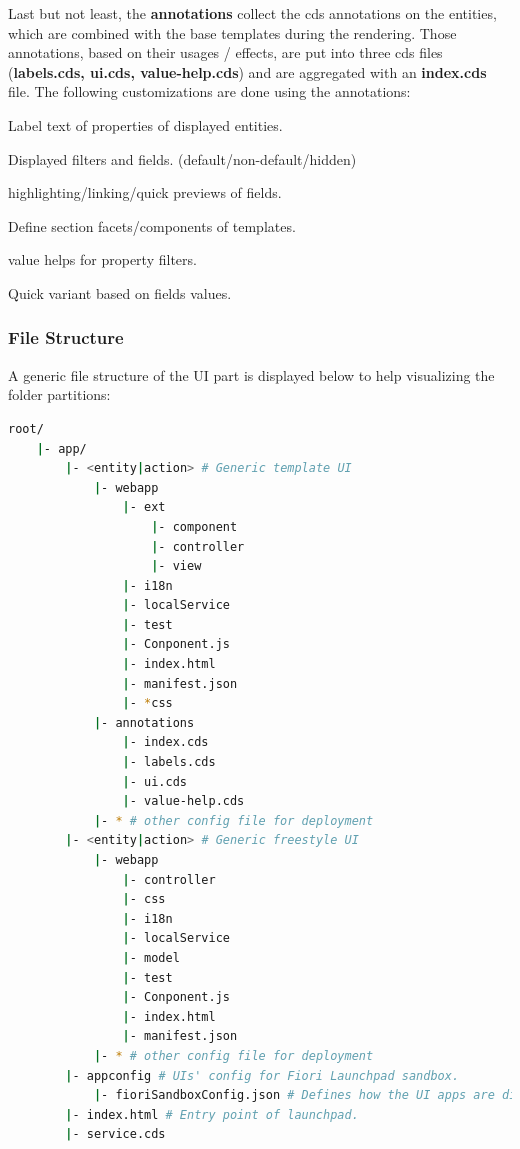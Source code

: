 \bigskip
Last but not least, the \textbf{annotations} collect the cds annotations on the entities, which are combined with the base templates during the rendering.
Those annotations, based on their usages / effects, are put into three cds files (\textbf{labels.cds, ui.cds, value-help.cds}) and are aggregated with an \textbf{index.cds} file.
The following customizations are done using the annotations:

\begin{compactenum}
    \item Label text of properties of displayed entities.
    \item Displayed filters and fields. (default/non-default/hidden)
    \item highlighting/linking/quick previews of fields.
    \item Define section facets/components of templates.
    \item value helps for property filters.
    \item Quick variant based on fields values.
\end{compactenum}

\subsubsection{File Structure}

A generic file structure of the UI part is displayed below to help visualizing the folder partitions: 

\begin{lstlisting}[language={bash}]
root/
    |- app/
        |- <entity|action> # Generic template UI
            |- webapp
                |- ext
                    |- component 
                    |- controller
                    |- view
                |- i18n
                |- localService
                |- test
                |- Conponent.js
                |- index.html
                |- manifest.json
                |- *css 
            |- annotations
                |- index.cds
                |- labels.cds
                |- ui.cds
                |- value-help.cds
            |- * # other config file for deployment
        |- <entity|action> # Generic freestyle UI
            |- webapp
                |- controller
                |- css
                |- i18n
                |- localService
                |- model
                |- test
                |- Conponent.js
                |- index.html
                |- manifest.json
            |- * # other config file for deployment
        |- appconfig # UIs' config for Fiori Launchpad sandbox.
            |- fioriSandboxConfig.json # Defines how the UI apps are dispalyed and navigated.
        |- index.html # Entry point of launchpad.
        |- service.cds
\end{lstlisting}

